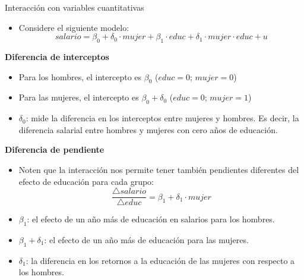 \documentclass{beamer}
\begin{document}
\begin{frame}[shrink=10]{Interacción con variables cuantitativas}
\begin{itemize}
    \item Considere el siguiente modelo:
    \[
    salario = \beta_0 + \delta_0 \cdot mujer + \beta_1 \cdot educ + \delta_1 \cdot mujer \cdot educ + u
    \]
\end{itemize}
\textbf{ Diferencia de interceptos}
    \begin{itemize}
        \item Para los hombres, el intercepto es \(\beta_0\) (\(educ = 0\); \(mujer = 0\))
        \item Para las mujeres, el intercepto es \(\beta_0 + \delta_0\) (\(educ = 0\); \(mujer = 1\))
        \item \(\delta_0\): mide la diferencia en los interceptos entre mujeres y hombres. Es decir, la diferencia salarial entre hombres y mujeres con cero años de educación.
    \end{itemize}

\textbf{Diferencia de pendiente}
    \begin{itemize}
        \item Noten que la interacción nos permite tener también pendientes diferentes del efecto de educación para cada grupo:
        \[
        \frac{\triangle salario}{\triangle educ} = \beta_1 + \delta_1 \cdot mujer
        \]
        \item \(\beta_1\): el efecto de un año más de educación en salarios para los hombres.
        \item \(\beta_1 + \delta_1\): el efecto de un año más de educación para las mujeres.
        \item \(\delta_1\): la diferencia en los retornos a la educación de las mujeres con respecto a los hombres.
    \end{itemize}
\end{frame}
\end{document}
